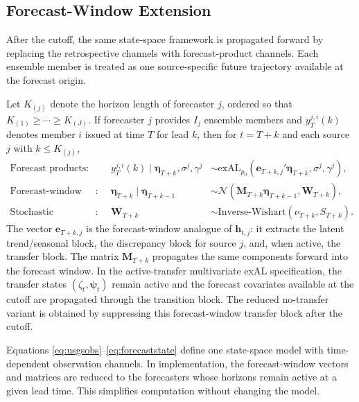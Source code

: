 \documentclass[APA,STIX1COL]{WileyNJD-v2}
\begin{document}
\subsection{Forecast-Window Extension}
\label{subsec:forecastwindow}

After the cutoff, the same state-space framework is propagated forward by replacing the retrospective channels with forecast-product channels. Each ensemble member is treated as one source-specific future trajectory available at the forecast origin.

Let \(K_{(j)}\) denote the horizon length of forecaster \(j\), ordered so that \(K_{(1)} \ge \cdots \ge K_{(J)}\). If forecaster \(j\) provides \(I_j\) ensemble members and \(y_T^{j,i}(k)\) denotes member \(i\) issued at time \(T\) for lead \(k\), then for \(t=T+k\) and each source \(j\) with \(k \le K_{(j)}\),
\begin{align}
    \text{Forecast products}:&& y_T^{j,i}(k) \mid \boldsymbol{\eta}_{T+k}, \sigma^j, \gamma^j &\sim \text{exAL}_{p_0}\!\left(\mathbf{e}_{T+k,j}' \boldsymbol{\eta}_{T+k}, \sigma^j, \gamma^j\right), \label{eq:forecastobs} \\
    \text{Forecast-window states}:&& \boldsymbol{\eta}_{T+k} \mid \boldsymbol{\eta}_{T+k-1} &\sim \mathcal{N}\!\left(\boldsymbol{M}_{T+k} \boldsymbol{\eta}_{T+k-1}, \mathbf{W}_{T+k}\right), \label{eq:forecaststate} \\
    \text{Stochastic covariance}:&& \mathbf{W}_{T+k} &\sim \text{Inverse-Wishart}(\nu_{T+k}, S_{T+k}).
\end{align}
The vector \(\mathbf{e}_{T+k,j}\) is the forecast-window analogue of \(\mathbf{h}_{t,j}\): it extracts the latent trend/seasonal block, the discrepancy block for source \(j\), and, when active, the transfer block. The matrix \(\boldsymbol{M}_{T+k}\) propagates the same components forward into the forecast window. In the active-transfer multivariate exAL specification, the transfer states \((\zeta_t,\boldsymbol{\psi}_t)\) remain active and the forecast covariates available at the cutoff are propagated through the transition block. The reduced no-transfer variant is obtained by suppressing this forecast-window transfer block after the cutoff.

Equations \eqref{eq:usgsobs}--\eqref{eq:forecaststate} define one state-space model with time-dependent observation channels. In implementation, the forecast-window vectors and matrices are reduced to the forecasters whose horizons remain active at a given lead time. This simplifies computation without changing the model.
\end{document}
